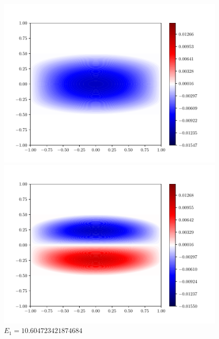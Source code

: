 \documentclass{article}
\begin{document}
\begin{enumerate}[1.]
\begin{enumerate}[(A)]
\begin{enumerate}[(i)]
      \begin{figure}[H]
        \centering
        \begin{minipage}{0.3\linewidth}
          \centering
          \includegraphics[width=\linewidth]{q6c-0.pdf}
          \caption*{$E_0= 6.369778636492784$}
        \end{minipage}
        \begin{minipage}{0.3\linewidth}
          \centering
          \includegraphics[width=\linewidth]{q6c-1.pdf}
          \caption*{$E_1= 10.604723421874684$}
        \end{minipage}
        \begin{minipage}{0.3\linewidth}
          \centering

\end{minipage}
\end{figure}
\end{enumerate}
\end{enumerate}
\end{enumerate}
\end{document}
